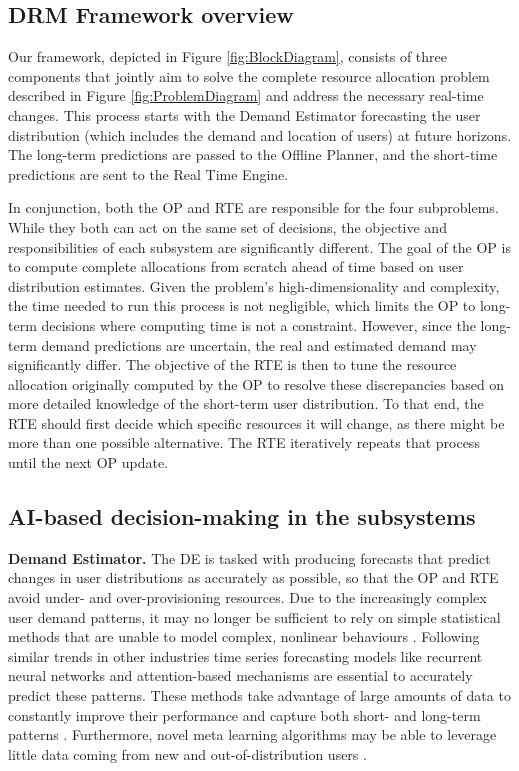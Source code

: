 \documentclass[letterpaper]{article} %
\begin{document}
\subsection{DRM Framework overview}

Our framework, depicted in Figure \ref{fig:BlockDiagram}, consists of three components that jointly aim to solve the complete resource allocation problem described in Figure \ref{fig:ProblemDiagram} and address the necessary real-time changes. This process starts with the Demand Estimator forecasting the user distribution (which includes the demand and location of users) at future horizons. The long-term predictions are passed to the Offline Planner, and the short-time predictions are sent to the Real Time Engine.


In conjunction, both the OP and RTE are responsible for the four subproblems. While they both can act on the same set of decisions, the objective and responsibilities of each subsystem are significantly different. The goal of the OP is to compute complete allocations from scratch ahead of time based on user distribution estimates. Given the problem's high-dimensionality and complexity, the time needed to run this process is not negligible, which limits the OP to long-term decisions where computing time is not a constraint. However, since the long-term demand predictions are uncertain, the real and estimated demand may significantly differ. The objective of the RTE is then to tune the resource allocation originally computed by the OP to resolve these discrepancies based on more detailed knowledge of the short-term user distribution. To that end, the RTE should first decide which specific resources it will change, as there might be more than one possible alternative. The RTE iteratively repeats that process until the next OP update.


\subsection{AI-based decision-making in the subsystems}

\textbf{Demand Estimator.} The DE is tasked with producing forecasts that predict changes in user distributions as accurately as possible, so that the OP and RTE avoid under- and over-provisioning resources. Due to the increasingly complex user demand patterns, it may no longer be sufficient to rely on simple statistical methods that are unable to model complex, nonlinear behaviours \cite{Suganthi2012}. Following similar trends in other industries \cite{Fildes2002, Zhao2012, Wang2017, Panapakidis2016, Sagheer2019} time series forecasting models like recurrent neural networks and attention-based mechanisms \cite{Vaswani2017} are essential to accurately predict these patterns. These methods take advantage of large amounts of data to constantly improve their performance and capture both short- and long-term patterns \cite{Vaswani2017}. Furthermore, novel meta learning algorithms may be able to leverage little data coming from new and out-of-distribution users \cite{Panigrahi2021}.
\end{document}

